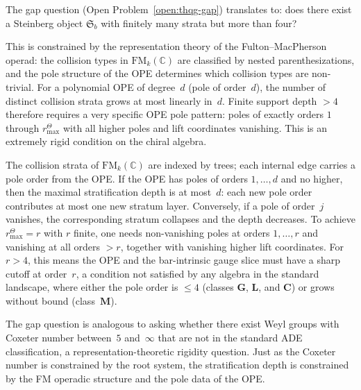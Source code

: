 \begin{proposition}
\ClaimStatusConjectured
The gap question \textup{(}Open
Problem~\ref{open:thqg-gap}\textup{)} translates to: does
there exist a Steinberg object $\mathfrak{S}_b$ with
finitely many strata but more than four?

This is constrained by the representation theory of the
Fulton--MacPherson operad: the collision types in
$\mathrm{FM}_k(\mathbb{C})$ are classified by nested
parenthesizations, and the pole structure of the OPE
determines which collision types are non-trivial. For a
polynomial OPE of degree~$d$ (pole of order~$d$), the
number of distinct collision strata grows at most linearly
in~$d$. Finite support depth \(>4\) therefore requires a
very specific OPE pole pattern: poles of exactly orders
\(1\) through \(r^\Theta_{\max}\) with all higher poles and lift
coordinates vanishing.
This is an extremely rigid condition on the chiral algebra.
\end{proposition}

\begin{remark}[Evidence]
The collision strata of $\mathrm{FM}_k(\mathbb{C})$ are
indexed by trees; each internal edge carries a pole order
from the OPE. If the OPE has poles of orders
$1, \ldots, d$ and no higher, then the maximal
stratification depth is at most~$d$: each new pole order
contributes at most one new stratum layer. Conversely, if
a pole of order~$j$ vanishes, the corresponding stratum
collapses and the depth decreases. To achieve
\(r^\Theta_{\max}=r\) with \(r\) finite, one needs non-vanishing
poles at orders $1, \ldots, r$ and vanishing at all orders
\(>r\), together with vanishing higher lift coordinates. For
\(r>4\), this means the OPE and the bar-intrinsic gauge slice must
have a sharp cutoff at order~$r$, a condition not satisfied by any
algebra in the standard landscape, where either the pole
order is $\leq 4$ (classes $\mathbf{G}$, $\mathbf{L}$,
and $\mathbf{C}$) or grows without bound (class~$\mathbf{M}$).
\end{remark}

\begin{remark}
The gap question is analogous to asking whether there exist
Weyl groups with Coxeter number between~$5$ and~$\infty$
that are not in the standard ADE classification, a
representation-theoretic rigidity question. Just as the
Coxeter number is constrained by the root system, the
stratification depth is constrained by the FM operadic
structure and the pole data of the OPE.
\end{remark}

